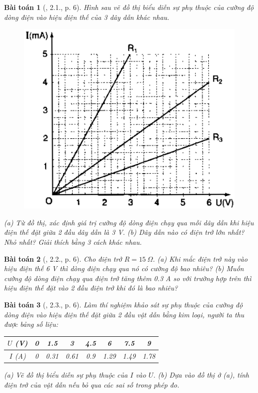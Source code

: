 \documentclass{article}
\newtheorem{baitoan}{Bài toán}
\begin{document}
\begin{baitoan}[\cite{SBT_Vat_Ly_9}, 2.1., p. 6]
	Hình sau vẽ đồ thị biểu diễn sự phụ thuộc của cường độ dòng điện vào hiệu điện thế của 3 dây dẫn khác nhau.
	\begin{figure}[H]
		\centering
		\includegraphics[scale=0.25]{SBT_2.1}
	\end{figure}
	\noindent(a) Từ đồ thị, xác định giá trị cường độ dòng điện chạy qua mỗi dây dẫn khi hiệu điện thế đặt giữa 2 đầu dây dẫn là \emph{3 V}. (b) Dây dẫn nào có điện trở lớn nhất? Nhỏ nhất? Giải thích bằng 3 cách khác nhau.
\end{baitoan}

\begin{baitoan}[\cite{SBT_Vat_Ly_9}, 2.2., p. 6]
	Cho điện trở $R = 15\ \Omega$. (a) Khi mắc điện trở này vào hiệu điện thế \emph{6 V} thì dòng điện chạy qua nó có cường độ bao nhiêu? (b) Muốn cường độ dòng điện chạy qua điện trở tăng thêm \emph{0.3 A} so với trường hợp trên thì hiệu điện thế đặt vào 2 đầu điện trở khi đó là bao nhiêu?
\end{baitoan}

\begin{baitoan}[\cite{SBT_Vat_Ly_9}, 2.3., p. 6]
	Làm thí nghiệm khảo sát sự phụ thuộc của cường độ dòng điện vào hiệu điện thế đặt giữa 2 đầu vật dẫn bằng kim loại, người ta thu được bảng số liệu:
	\begin{table}[H]
		\centering
		\begin{tabular}{|c|c|c|c|c|c|c|c|}
			\hline
			$U$ (V) & 0 & 1.5 & 3 & 4.5 & 6 & 7.5 & 9 \\
			\hline
			$I$ (A) & 0 & 0.31 & 0.61 & 0.9 & 1.29 & 1.49 & 1.78 \\
			\hline
		\end{tabular}
	\end{table}
	\noindent(a) Vẽ đồ thị biểu diễn sự phụ thuộc của $I$ vào $U$. (b) Dựa vào đồ thị ở (a), tính điện trở của vật dẫn nếu bỏ qua các sai số trong phép đo.
\end{baitoan}
\end{document}
